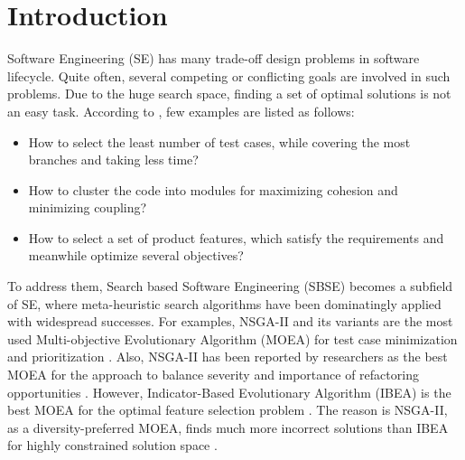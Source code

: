 \section{Introduction}\label{sec:intro}


Software Engineering (SE) has many trade-off design problems in software lifecycle. Quite often, several competing  or  conflicting goals are involved in such problems. Due to the huge search space, finding a set of optimal solutions is not an easy task. According to \cite{DBLP:journals/csur/HarmanMZ12}, few examples are listed as follows: %
\begin{itemize}
\item  How to select the least number of test cases, while covering the most branches and taking less time?
\item  How to cluster the code into modules for maximizing cohesion and minimizing coupling?
\item  How to select a set of product features, which satisfy the requirements and meanwhile optimize several objectives?
\end{itemize}

To address them, Search based Software Engineering (SBSE) becomes a subfield of SE, where meta-heuristic search algorithms have been dominatingly applied with widespread successes. For examples, NSGA-II and its variants are the most used Multi-objective Evolutionary Algorithm (MOEA) for test case minimization \cite{DBLP:conf/issta/YooH07} and prioritization \cite{DBLP:journals/tse/MarchettoIASS16}. Also, NSGA-II has been reported by researchers as the best MOEA for the approach to balance severity and importance of refactoring opportunities \cite{DBLP:journals/ese/MkaouerKCHD17}. However, Indicator-Based Evolutionary Algorithm (IBEA) is the best MOEA for the optimal feature selection problem \cite{DBLP:conf/icse/SayyadMA13}. The reason is NSGA-II, as a diversity-preferred MOEA, finds much more incorrect solutions than IBEA for highly constrained solution space \cite{DBLP:dblp_conf/kbse/SayyadIMA13}.

